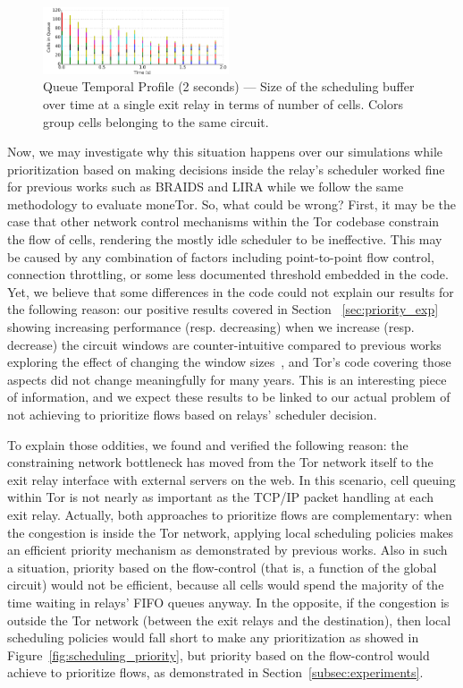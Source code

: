 \begin{figure} \centering
  \includegraphics[width=0.49\textwidth]{images/scheduling_close.png}
  \caption[Queue Temporal Profile (2 seconds)]{Queue Temporal Profile
      (2 seconds) --- Size of the scheduling buffer over time at a single exit
    relay in terms of number of cells. Colors group cells belonging to the same
    circuit.}
  \label{fig:scheduling_close}
\end{figure}

Now, we may investigate why this situation happens over our simulations while prioritization based on making decisions inside the 
relay's scheduler worked fine for previous works such as BRAIDS and LIRA while we 
follow the same methodology to evaluate moneTor. So, what could be wrong? First, 
it may be the case
that other network control mechanisms within the Tor codebase constrain the flow
of cells, rendering the mostly idle scheduler to be ineffective. This may be
caused by any combination of factors including point-to-point flow control,
connection throttling, or some less documented threshold embedded in the
code. Yet, we believe that some differences in the code could not explain our 
results for the following reason: our positive results covered in Section~
\ref{sec:priority_exp} showing
increasing performance (resp. decreasing) when we increase (resp. decrease) the 
circuit windows are counter-intuitive compared to previous works exploring the 
effect of changing the window sizes~\cite{archive-2009-mail, kiraly2008solving, 
dingledine2009performance}, and Tor's code covering those aspects did not change 
meaningfully for many years. This is an interesting piece of information, and we 
expect these results to be linked to our actual 
problem of not achieving to prioritize flows based on relays' scheduler decision.

To explain those oddities, we found and verified the following reason: the 
constraining network bottleneck has moved from the
Tor network itself to the exit relay interface with external servers on the
web. In this scenario, cell queuing within Tor is not nearly as important as the
TCP/IP packet handling at each exit relay. Actually, both approaches to prioritize 
flows are complementary: when the congestion is inside the Tor network, applying 
local scheduling policies makes an efficient priority mechanism as demonstrated by previous works. Also in such a situation, priority 
based on the flow-control (that is, a function of the global circuit) would not be 
efficient, because all cells would spend the majority of the time waiting in 
relays' FIFO queues anyway. In the opposite, if the congestion is outside the Tor 
network (between the exit relays and the destination), then local scheduling 
policies would fall short to make any prioritization as showed in Figure~\ref{fig:scheduling_priority}, but priority based on the 
flow-control would achieve to prioritize flows, as demonstrated in Section~\ref{subsec:experiments}. 

